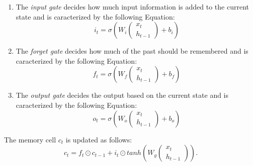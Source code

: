 \begin{enumerate}
    \item The \textit{input gate} decides how much input information is 
    added to the current state and is caracterized by the following Equation:
        \begin{equation}
            i_t = \sigma \left(
                W_i
                \begin{pmatrix}
                x_t \\
                h_{t-1}
                \end{pmatrix}
                + b_i
            \right)
        \end{equation}
    
    \item The \textit{forget gate} decides how much of the past should 
    be remembered and is caracterized by the following Equation:
        \begin{equation}
            f_t = \sigma \left(
                W_f
                \begin{pmatrix}
                x_t \\
                h_{t-1}
                \end{pmatrix}
                + b_f
            \right)
        \end{equation}

    \item The \textit{output gate} decides the output based on the current state and is caracterized by the following Equation:
        \begin{equation}
            o_t = \sigma \left(
                W_o
                \begin{pmatrix}
                x_t \\
                h_{t-1}
                \end{pmatrix}
                + b_o
            \right)
        \end{equation}

\end{enumerate}


The memory cell $c_t$ is updated as follows:
\begin{equation}
    c_t = f_t \odot c_{t-1} + i_t \odot tanh \left( W_g
        \begin{pmatrix}
            x_t \\
            h_{t-1}
        \end{pmatrix}
        \right) .
\end{equation}

